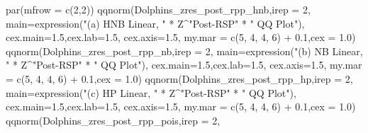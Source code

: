\documentclass[
  english,
  letterpaper,
  DIV=11,
  numbers=noendperiod]{scrartcl}
\newenvironment{Shaded}{\begin{snugshade}}{\end{snugshade}}
\newcommand{\AttributeTok}[1]{\textcolor[rgb]{0.40,0.45,0.13}{#1}}
\newcommand{\DecValTok}[1]{\textcolor[rgb]{0.68,0.00,0.00}{#1}}
\newcommand{\FloatTok}[1]{\textcolor[rgb]{0.68,0.00,0.00}{#1}}
\newcommand{\FunctionTok}[1]{\textcolor[rgb]{0.28,0.35,0.67}{#1}}
\newcommand{\NormalTok}[1]{\textcolor[rgb]{0.00,0.23,0.31}{#1}}
\newcommand{\SpecialCharTok}[1]{\textcolor[rgb]{0.37,0.37,0.37}{#1}}
\newcommand{\StringTok}[1]{\textcolor[rgb]{0.13,0.47,0.30}{#1}}
\begin{document}
\begin{Shaded}
\begin{Highlighting}[]
\FunctionTok{par}\NormalTok{(}\AttributeTok{mfrow =} \FunctionTok{c}\NormalTok{(}\DecValTok{2}\NormalTok{,}\DecValTok{2}\NormalTok{))}
\FunctionTok{qqnorm}\NormalTok{(Dolphins\_zres\_post\_rpp\_hnb,}\AttributeTok{irep =} \DecValTok{2}\NormalTok{,}
              \AttributeTok{main=}\FunctionTok{expression}\NormalTok{(}\StringTok{"(a) HNB Linear, "} \SpecialCharTok{*}\NormalTok{ Z}\SpecialCharTok{\^{}}\StringTok{"Post{-}RSP"} \SpecialCharTok{*} \StringTok{" QQ Plot"}\NormalTok{),}
              \AttributeTok{cex.main=}\FloatTok{1.5}\NormalTok{,}\AttributeTok{cex.lab=}\FloatTok{1.5}\NormalTok{, }\AttributeTok{cex.axis=}\FloatTok{1.5}\NormalTok{, }\AttributeTok{my.mar =} \FunctionTok{c}\NormalTok{(}\DecValTok{5}\NormalTok{, }\DecValTok{4}\NormalTok{, }\DecValTok{4}\NormalTok{, }\DecValTok{6}\NormalTok{) }\SpecialCharTok{+} \FloatTok{0.1}\NormalTok{,}\AttributeTok{cex =} \FloatTok{1.0}\NormalTok{)}
\FunctionTok{qqnorm}\NormalTok{(Dolphins\_zres\_post\_rpp\_nb,}\AttributeTok{irep =} \DecValTok{2}\NormalTok{,}
              \AttributeTok{main=}\FunctionTok{expression}\NormalTok{(}\StringTok{"(b) NB Linear, "} \SpecialCharTok{*}\NormalTok{ Z}\SpecialCharTok{\^{}}\StringTok{"Post{-}RSP"} \SpecialCharTok{*} \StringTok{" QQ Plot"}\NormalTok{),}
              \AttributeTok{cex.main=}\FloatTok{1.5}\NormalTok{,}\AttributeTok{cex.lab=}\FloatTok{1.5}\NormalTok{, }\AttributeTok{cex.axis=}\FloatTok{1.5}\NormalTok{, }\AttributeTok{my.mar =} \FunctionTok{c}\NormalTok{(}\DecValTok{5}\NormalTok{, }\DecValTok{4}\NormalTok{, }\DecValTok{4}\NormalTok{, }\DecValTok{6}\NormalTok{) }\SpecialCharTok{+} \FloatTok{0.1}\NormalTok{,}\AttributeTok{cex =} \FloatTok{1.0}\NormalTok{)}
\FunctionTok{qqnorm}\NormalTok{(Dolphins\_zres\_post\_rpp\_hp,}\AttributeTok{irep =} \DecValTok{2}\NormalTok{,}
              \AttributeTok{main=}\FunctionTok{expression}\NormalTok{(}\StringTok{"(c) HP Linear, "} \SpecialCharTok{*}\NormalTok{ Z}\SpecialCharTok{\^{}}\StringTok{"Post{-}RSP"} \SpecialCharTok{*} \StringTok{" QQ Plot"}\NormalTok{),}
              \AttributeTok{cex.main=}\FloatTok{1.5}\NormalTok{,}\AttributeTok{cex.lab=}\FloatTok{1.5}\NormalTok{, }\AttributeTok{cex.axis=}\FloatTok{1.5}\NormalTok{, }\AttributeTok{my.mar =} \FunctionTok{c}\NormalTok{(}\DecValTok{5}\NormalTok{, }\DecValTok{4}\NormalTok{, }\DecValTok{4}\NormalTok{, }\DecValTok{6}\NormalTok{) }\SpecialCharTok{+} \FloatTok{0.1}\NormalTok{,}\AttributeTok{cex =} \FloatTok{1.0}\NormalTok{)}
\FunctionTok{qqnorm}\NormalTok{(Dolphins\_zres\_post\_rpp\_pois,}\AttributeTok{irep =} \DecValTok{2}\NormalTok{,}

\end{Highlighting}
\end{Shaded}
\end{document}
